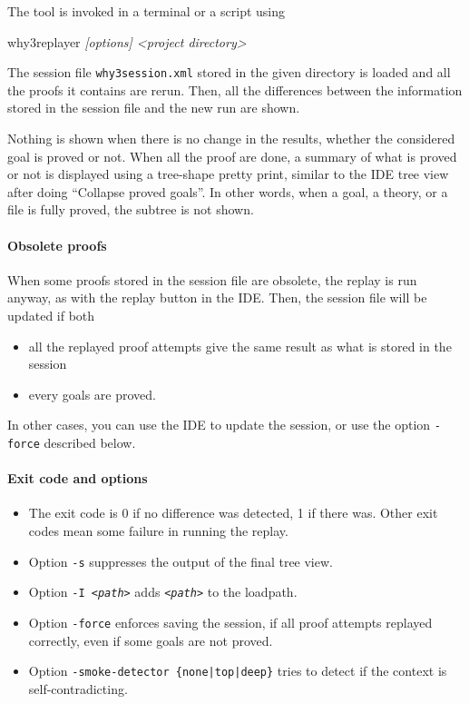 The tool is invoked in a terminal or a script using
\begin{flushleft}\ttfamily
  why3replayer \textsl{[options] <project directory>}
\end{flushleft}
The session file \texttt{why3session.xml} stored in the given
directory is loaded and all the proofs it contains are rerun. Then,
all the differences between the information stored in the session file and
the new run are shown.

Nothing is shown when there is no change in the results, whether the
considered goal is proved or not. When all the proof
are done, a summary of what is proved or not is displayed using a
tree-shape pretty print, similar to the IDE tree view after doing
``Collapse proved goals''. In other words, when a goal, a theory, or a
file is fully proved, the subtree is not shown.

\paragraph{Obsolete proofs}

When some proofs stored in the session file are obsolete, the replay is
run anyway, as with the replay button in the IDE. Then, the session
file will be updated if both 
\begin{itemize}
\item all the replayed proof attempts give the same result as what
  is stored in the session
\item every goals are proved.
\end{itemize}
In other cases, you can use the IDE to update the session, or use the
option \verb|-force| described below.

\paragraph{Exit code and options}

\begin{itemize}
\item The exit code is 0 if no difference was detected, 1 if there
  was. Other exit codes mean some failure in running the replay.
\item Option \verb|-s| suppresses the output of the final tree view.
\item Option \texttt{-I \textsl{<path>}} adds \texttt{\textsl{<path>}} to the loadpath.
\item Option \verb|-force| enforces saving the session, if all proof
  attempts replayed correctly, even if some goals are not proved.
\item Option \texttt{-smoke-detector \{none|top|deep\}} tries to detect
  if the context is self-contradicting.
\end{itemize}

